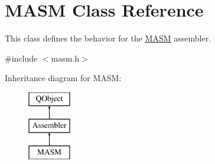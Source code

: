 \hypertarget{class_m_a_s_m}{}\section{M\+A\+S\+M Class Reference}
\label{class_m_a_s_m}


This class defines the behavior for the \hyperlink{class_m_a_s_m}{M\+A\+S\+M} assembler.  




{\ttfamily \#include $<$masm.\+h$>$}

Inheritance diagram for M\+A\+S\+M\+:\begin{figure}[H]
\begin{center}
\leavevmode
\includegraphics[height=3.000000cm]{class_m_a_s_m}
\end{center}
\end{figure}
